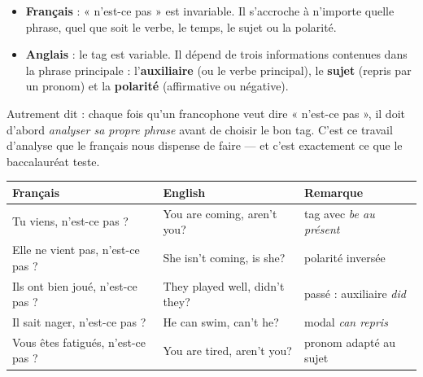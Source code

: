 \documentclass[11pt]{article}
\newcommand{\cle}[1]{{\popxbold\color{popdark}#1}}
\newcommand{\eng}[1]{\ifmmode\text{\textit{#1}}\else\begingroup\selectlanguage{english}\itshape #1\endgroup\fi}
\begin{document}
\begin{propriete}
\begin{itemize}
\item \textbf{Français} : « n'est-ce pas » est \cle{invariable}. Il s'accroche à n'importe quelle phrase, quel que soit le verbe, le temps, le sujet ou la polarité.
\item \textbf{Anglais} : le tag est \cle{variable}. Il dépend de trois informations contenues dans la phrase principale : l'\textbf{auxiliaire} (ou le verbe principal), le \textbf{sujet} (repris par un pronom) et la \textbf{polarité} (affirmative ou négative).
\end{itemize}
Autrement dit : chaque fois qu'un francophone veut dire « n'est-ce pas », il doit d'abord \emph{analyser sa propre phrase} avant de choisir le bon tag. C'est ce travail d'analyse que le français nous dispense de faire — et c'est exactement ce que le baccalauréat teste.
\end{propriete}

\begin{center}
\begin{tabularx}{\linewidth}{|X|X|X|}
\hline
\rowcolor{popblueL} Français & English & Remarque \\
\hline
Tu viens, n'est-ce pas ? & You are coming, aren't you? & tag avec \eng{be} au présent \\
\hline
Elle ne vient pas, n'est-ce pas ? & She isn't coming, is she? & polarité inversée \\
\hline
Ils ont bien joué, n'est-ce pas ? & They played well, didn't they? & passé : auxiliaire \eng{did} \\
\hline
Il sait nager, n'est-ce pas ? & He can swim, can't he? & modal \eng{can} repris \\
\hline
Vous êtes fatigués, n'est-ce pas ? & You are tired, aren't you? & pronom adapté au sujet \\
\hline
\end{tabularx}
\end{center}
\end{document}
